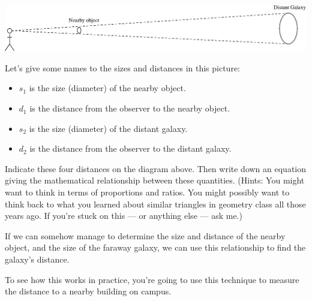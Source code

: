 \centerline{\includegraphics[width=6in]{localdistance/localdistance1.eps}}

Let's give some names to the sizes and distances in this picture:
\begin{itemize}
\item $s_1$ is the size (diameter) of the nearby object.
\item $d_1$ is the distance from the observer to the nearby object.
\item $s_2$ is the size (diameter) of the distant galaxy.
\item $d_2$ is the distance from the observer to the distant galaxy.
\end{itemize}

Indicate these four distances on the diagram above.  Then write down 
an equation giving the mathematical relationship between these
quantities.  (Hints: You might want to think in terms of 
proportions and ratios.  You might possibly want to think back to 
what you learned about similar triangles in geometry class all those years ago.
If you're stuck on this --- or anything else --- ask me.)

\vskip 1in

If we can somehow manage to determine the size and distance of
the nearby object, and the size of the faraway galaxy, we can 
use this relationship to find the galaxy's distance.

To see how this works in practice, you're going to use this
technique to measure the distance to a nearby building on campus.

